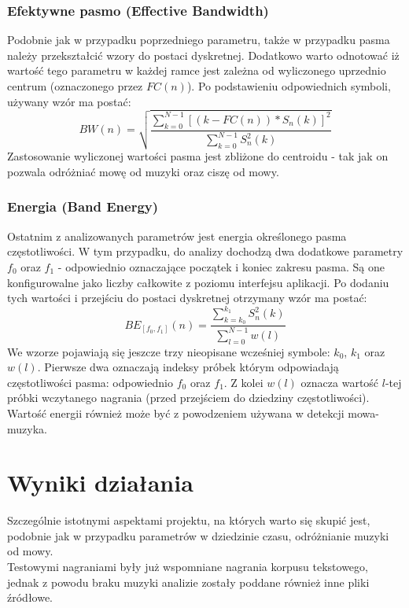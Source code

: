 \documentclass[a4paper]{article}
\begin{document}
\subsubsection{Efektywne pasmo (Effective Bandwidth)}
Podobnie jak w przypadku poprzedniego parametru, także w przypadku pasma należy przekształcić wzory do postaci dyskretnej. Dodatkowo warto odnotować iż wartość tego parametru w każdej ramce jest zależna od wyliczonego uprzednio centrum (oznaczonego przez $FC(n)$). Po podstawieniu odpowiednich symboli, używany wzór ma postać:
\begin{equation}
BW(n) = \sqrt{\frac{\sum_{k=0}^{N-1}[(k-FC(n))*S_n(k)]^2}{\sum_{k=0}^{N-1}S_n^2(k)}}
\end{equation}
Zastosowanie wyliczonej wartości pasma jest zbliżone do centroidu - tak jak on pozwala odróżniać mowę od muzyki oraz ciszę od mowy.

\subsubsection{Energia (Band Energy)}
Ostatnim z analizowanych parametrów jest energia określonego pasma częstotliwości. W tym przypadku, do analizy dochodzą dwa dodatkowe parametry $f_0$ oraz $f_1$ - odpowiednio oznaczające początek i koniec zakresu pasma. Są one konfigurowalne jako liczby całkowite z poziomu interfejsu aplikacji. Po dodaniu tych wartości i przejściu do postaci dyskretnej otrzymany wzór ma postać:
\begin{equation}
BE_{[f_0, f_1]}(n) = \frac{\sum_{k=k_0}^{k_1}S_n^2(k)}{\sum_{l=0}^{N-1}w(l)}
\end{equation}
We wzorze pojawiają się jeszcze trzy nieopisane wcześniej symbole: $k_0$, $k_1$ oraz $w(l)$. Pierwsze dwa oznaczają indeksy próbek którym odpowiadają częstotliwości pasma: odpowiednio $f_0$ oraz $f_1$. Z kolei $w(l)$ oznacza wartość $l$-tej próbki wczytanego nagrania (przed przejściem do dziedziny częstotliwości).\\
Wartość energii również może być z powodzeniem używana w detekcji mowa-muzyka.

\section{Wyniki działania}
Szczególnie istotnymi aspektami projektu, na których warto się skupić jest, podobnie jak w przypadku parametrów w dziedzinie czasu, odróżnianie muzyki od mowy.\\
Testowymi nagraniami były już wspomniane nagrania korpusu tekstowego, jednak z powodu braku muzyki analizie zostały poddane również inne pliki źródłowe.
\end{document}
